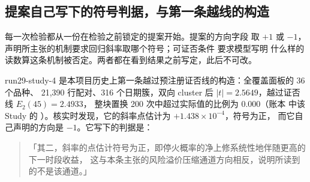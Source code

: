 
\subsection{提案自己写下的符号判据，与第一条越线的构造}

每一次检验都从一份在检验之前锁定的提案开始。提案的方向字段  取 $+1$ 或 $-1$，
声明所主张的机制要求回归斜率取哪个符号；可证否条件  要求模型写明
什么样的读数算这条机制被否定。两者都在看到结果之前写定，此后不可改。

run29-study-4 是本项目历史上第一条越过预注册证否线的构造：全覆盖面板的 36 个品种、
21{,}390 行配对、316 个日期簇，双向 cluster 后 $|t|=2.5649$，越过证否线 $E_2(45)=2.4933$，
整块置换 200 次中超过实际值的比例为 $0.000$（账本  中该 Study 的
）。核实时发现，它的斜率点估计为 $+1.438\times10^{-4}$，符号为正，
而它自己声明的方向是 $-1$。它写下的判据是：

\begin{quote}\small
「其二，斜率的点估计符号为正，即停火概率的净上修系统性地伴随更高的下一时段收益，
这与本条主张的风险溢价压缩通道方向相反，说明所读到的不是该通道。」
\end{quote}

